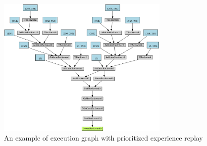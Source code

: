 \documentclass[11pt, a4paper, hidelinks]{report}
\begin{document}
\begin{figure}
\centering
\includegraphics[width=0.74\textwidth]{resources/d3qn_per_graph.png}
\caption{An example of execution graph with prioritized experience replay}
\label{fig:d3qn_per_graph}
\end{figure}

~\nocite{*}

\end{document}
